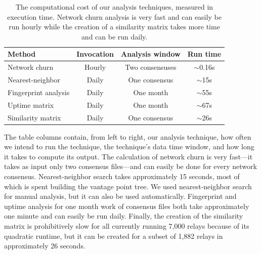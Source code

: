 \begin{table}[t]
	\centering
	\begin{tabular}{lccc}
	\textbf{Method} & \textbf{Invocation} & \textbf{Analysis window} & \textbf{Run time} \\
	\hline
	Network churn & Hourly & Two consensuses & $\sim$0.16s \\
	Nearest-neighbor & Daily & One consensus & $\sim$15s \\
	Fingerprint analysis & Daily & One month & $\sim$55s \\
	Uptime matrix & Daily & One month & $\sim$67s \\
	Similarity matrix & Daily & One consensus & $\sim$26s \\
	\end{tabular}
	\caption{The computational cost of our analysis techniques, measured in
	execution time.  Network churn analysis is very fast and can easily be run
	hourly while the creation of a similarity matrix takes more time and can be
	run daily.}
	\label{tab:exp-deployment}
\end{table}

The table columns contain, from left to right, our analysis technique, how often
we intend to run the technique, the technique's data time window, and how long
it takes to compute its output.  The calculation of network churn is very
fast---it takes as input only two consensus files---and can easily be done for
every network consensus.  Nearest-neighbor search takes approximately 15
seconds, most of which is spent building the vantage point tree.  We used
nearest-neighbor search for manual analysis, but it can also be used
automatically.  Fingerprint and uptime analysis for one month work of consensus
files both take approximately one minute and can easily be run daily.  Finally,
the creation of the similarity matrix is prohibitively slow for all currently
running 7,000 relays because of its quadratic runtime, but it can be created for
a subset of 1,882 relays in approximately 26 seconds.
